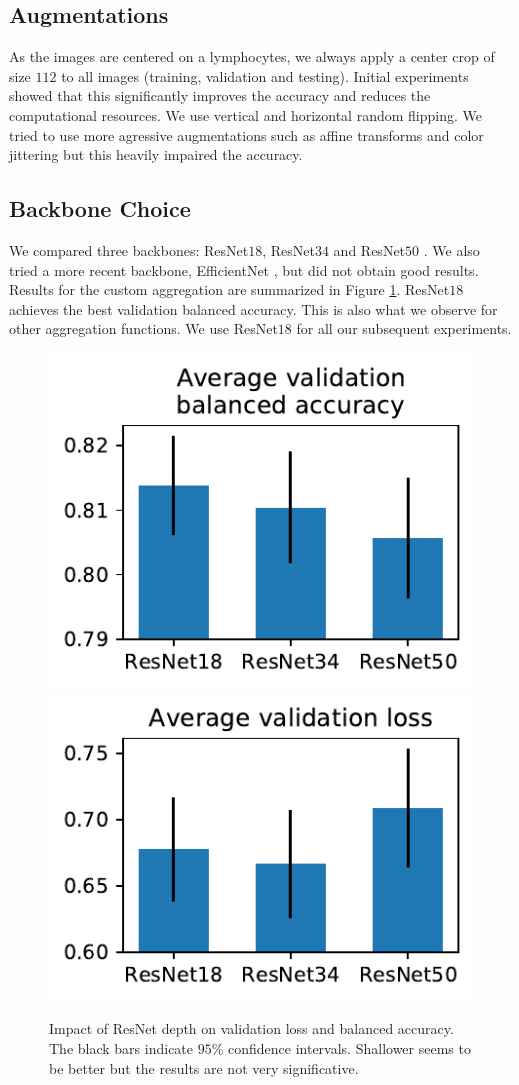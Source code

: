 \documentclass[final]{cvpr}
\begin{document}
	\subsection{Augmentations}
	
	As the images are centered on a lymphocytes, we always apply a center crop of size $112$ to all images (training, validation and testing). Initial experiments showed that this significantly improves the accuracy and reduces the computational resources. We use vertical and horizontal random flipping. We tried to use more agressive augmentations such as affine transforms and color jittering but this heavily impaired the accuracy.

	\subsection{Backbone Choice}
	
	We compared three backbones: ResNet$18$, ResNet$34$ and ResNet$50$ \cite{resnet}. We also tried a more recent backbone, EfficientNet \cite{efn}, but did not obtain good results. Results for the custom aggregation are summarized in Figure \ref{fig:resnet}. ResNet$18$ achieves the best validation balanced accuracy. This is also what we observe for other aggregation functions. We use ResNet$18$ for all our subsequent experiments.
	
	\begin{figure}[h]
		\begin{center}
			\includegraphics[width=0.49\linewidth]{fig/resnets_bal_acc.pdf}
			\includegraphics[width=0.49\linewidth]{fig/resnets_val_loss.pdf}
		\end{center}
		\caption{Impact of ResNet depth on validation loss and balanced accuracy. The black bars indicate $95\%$ confidence intervals. Shallower seems to be better but the results are not very significative.}
		\label{fig:resnet}
	\end{figure}
\end{document}

